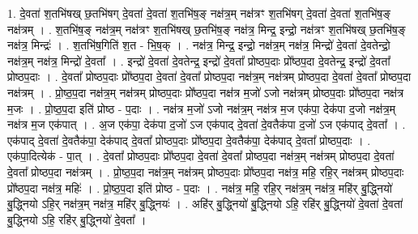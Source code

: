 \documentclass[17pt]{extarticle}
\begin{document}
1. दे॒वता॑ श॒तभि॑षख् छ॒तभि॑षग् दे॒वता॑ दे॒वता॑ श॒तभि॑ष॒ङ् नक्ष॑त्र॒म् नक्ष॑त्रꣳ श॒तभि॑षग् दे॒वता॑ दे॒वता॑ श॒तभि॑ष॒ङ् नक्ष॑त्रम् । . श॒तभि॑ष॒ङ् नक्ष॑त्र॒म् नक्ष॑त्रꣳ श॒तभि॑षख् छ॒तभि॑ष॒ङ् नक्ष॑त्र॒ मिन्द्र॒ इन्द्रो॒ नक्ष॑त्रꣳ श॒तभि॑षख् छ॒तभि॑ष॒ङ् नक्ष॑त्र॒ मिन्द्रः॑ । . श॒तभि॑ष॒गिति॑ श॒त - भि॒ष॒क् । . नक्ष॑त्र॒ मिन्द्र॒ इन्द्रो॒ नक्ष॑त्र॒म् नक्ष॑त्र॒ मिन्द्रो॑ दे॒वता॑ दे॒वतेन्द्रो॒ नक्ष॑त्र॒म् नक्ष॑त्र॒ मिन्द्रो॑ दे॒वता᳚ । . इन्द्रो॑ दे॒वता॑ दे॒वतेन्द्र॒ इन्द्रो॑ दे॒वता᳚ प्रोष्ठप॒दाः प्रो᳚ष्ठप॒दा दे॒वतेन्द्र॒ इन्द्रो॑ दे॒वता᳚ प्रोष्ठप॒दाः । . दे॒वता᳚ प्रोष्ठप॒दाः प्रो᳚ष्ठप॒दा दे॒वता॑ दे॒वता᳚ प्रोष्ठप॒दा नक्ष॑त्र॒म् नक्ष॑त्रम् प्रोष्ठप॒दा दे॒वता॑ दे॒वता᳚ प्रोष्ठप॒दा नक्ष॑त्रम् । . प्रो॒ष्ठ॒प॒दा नक्ष॑त्र॒म् नक्ष॑त्रम् प्रोष्ठप॒दाः प्रो᳚ष्ठप॒दा नक्ष॑त्र म॒जो॑ ऽजो नक्ष॑त्रम् प्रोष्ठप॒दाः प्रो᳚ष्ठप॒दा नक्ष॑त्र म॒जः । . प्रो॒ष्ठ॒प॒दा इति॑ प्रोष्ठ - प॒दाः । . नक्ष॑त्र म॒जो॑ ऽजो नक्ष॑त्र॒म् नक्ष॑त्र म॒ज एक॑पा॒ देक॑पा द॒जो नक्ष॑त्र॒म् नक्ष॑त्र म॒ज एक॑पात् । . अ॒ज एक॑पा॒ देक॑पा द॒जो॑ ऽज एक॑पाद् दे॒वता॑ दे॒वतैक॑पा द॒जो॑ ऽज एक॑पाद् दे॒वता᳚ । . एक॑पाद् दे॒वता॑ दे॒वतैक॑पा॒ देक॑पाद् दे॒वता᳚ प्रोष्ठप॒दाः प्रो᳚ष्ठप॒दा दे॒वतैक॑पा॒ देक॑पाद् दे॒वता᳚ प्रोष्ठप॒दाः । . एक॑पा॒दित्येक॑ - पा॒त् । . दे॒वता᳚ प्रोष्ठप॒दाः प्रो᳚ष्ठप॒दा दे॒वता॑ दे॒वता᳚ प्रोष्ठप॒दा नक्ष॑त्र॒म् नक्ष॑त्रम् प्रोष्ठप॒दा दे॒वता॑ दे॒वता᳚ प्रोष्ठप॒दा नक्ष॑त्रम् । . प्रो॒ष्ठ॒प॒दा नक्ष॑त्र॒म् नक्ष॑त्रम् प्रोष्ठप॒दाः प्रो᳚ष्ठप॒दा नक्ष॑त्र॒ महि॒ रहि॒र् नक्ष॑त्रम् प्रोष्ठप॒दाः प्रो᳚ष्ठप॒दा नक्ष॑त्र॒ महिः॑ । . प्रो॒ष्ठ॒प॒दा इति॑ प्रोष्ठ - प॒दाः । . नक्ष॑त्र॒ महि॒ रहि॒र् नक्ष॑त्र॒म् नक्ष॑त्र॒ महि॑र् बु॒द्ध्नियो॑ बु॒द्ध्नियो ऽहि॒र् नक्ष॑त्र॒म् नक्ष॑त्र॒ महि॑र् बु॒द्ध्नियः॑ । . अहि॑र् बु॒द्ध्नियो॑ बु॒द्ध्नियो ऽहि॒ रहि॑र् बु॒द्ध्नियो॑ दे॒वता॑ दे॒वता॑ बु॒द्ध्नियो ऽहि॒ रहि॑र् बु॒द्ध्नियो॑ दे॒वता᳚ । \newline
\end{document}
